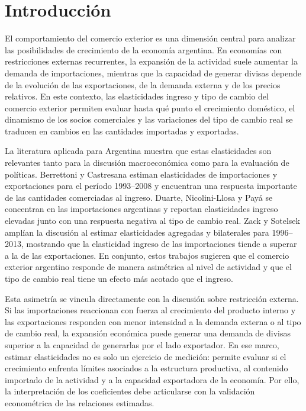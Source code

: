 \documentclass[11pt]{article}
\begin{document}
\section{Introducción}
\label{sec:introduccion}

El comportamiento del comercio exterior es una dimensión central para analizar
las posibilidades de crecimiento de la economía argentina. En economías con
restricciones externas recurrentes, la expansión de la actividad suele aumentar
la demanda de importaciones, mientras que la capacidad de generar divisas
depende de la evolución de las exportaciones, de la demanda externa y de los
precios relativos. En este contexto, las elasticidades ingreso y tipo de cambio
del comercio exterior permiten evaluar hasta qué punto el crecimiento doméstico,
el dinamismo de los socios comerciales y las variaciones del tipo de cambio real
se traducen en cambios en las cantidades importadas y exportadas.

La literatura aplicada para Argentina muestra que estas elasticidades son
relevantes tanto para la discusión macroeconómica como para la evaluación de
políticas. Berrettoni y Castresana \cite{berrettoni_castresana_2008} estiman
elasticidades de importaciones y exportaciones para el período 1993--2008 y
encuentran una respuesta importante de las cantidades comerciadas al ingreso.
Duarte, Nicolini-Llosa y Payá \cite{duarte_nicolini_llosa_paya_2007} se
concentran en las importaciones argentinas y reportan elasticidades ingreso
elevadas junto con una respuesta negativa al tipo de cambio real. Zack y
Sotelsek \cite{zack_sotelsek_2016} amplían la discusión al estimar
elasticidades agregadas y bilaterales para 1996--2013, mostrando que la
elasticidad ingreso de las importaciones tiende a superar a la de las
exportaciones. En conjunto, estos trabajos sugieren que el comercio exterior
argentino responde de manera asimétrica al nivel de actividad y que el tipo de
cambio real tiene un efecto más acotado que el ingreso.

Esta asimetría se vincula directamente con la discusión sobre restricción
externa. Si las importaciones reaccionan con fuerza al crecimiento del producto
interno y las exportaciones responden con menor intensidad a la demanda externa
o al tipo de cambio real, la expansión económica puede generar una demanda de
divisas superior a la capacidad de generarlas por el lado exportador. En ese
marco, estimar elasticidades no es solo un ejercicio de medición: permite
evaluar si el crecimiento enfrenta límites asociados a la estructura productiva,
al contenido importado de la actividad y a la capacidad exportadora de la
economía. Por ello, la interpretación de los coeficientes debe articularse con
la validación econométrica de las relaciones estimadas.
\end{document}
